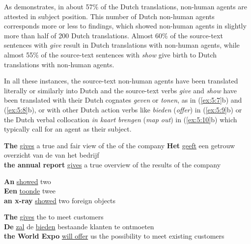\documentclass[output=paper]{LSP/langsci}
\begin{document}
\clearpage
As  demonstrates, in about 57\% of the Dutch translations, non-human agents are attested in subject position. This number of Dutch non-human agents corresponds more or less to \citet{Dhaeyere2010} findings, which showed non-human agents in slightly more than half of 200 Dutch translations. Almost 60\% of the source-text sentences with \textit{give} result in Dutch translations with non-human agents, while almost 55\% of the source-text sentences with \textit{show} give birth to Dutch translations with non-human agents.

In all these instances, the source-text non-human agents have been translated literally or similarly into Dutch and the source-text verbs \textit{give} and \textit{show} have been translated with their Dutch cognates \textit{geven} or \textit{tonen}, as in (\ref{ex:5:7}b) and (\ref{ex:5:8}b), or with other Dutch action verbs like \textit{bieden} (\textit{offer}) in (\ref{ex:5:9}b) or the Dutch verbal collocation \textit{in kaart brengen} (\textit{map out}) in (\ref{ex:5:10}b) which typically call for an agent as their subject.      

\ea \label{ex:5:7}
\ea
\textbf{The}  \ul{gives} a true and fair view of the  of the company
\ex
\textbf{Het}  \ul{geeft} een getrouw overzicht van de  van het bedrijf\\
\textbf{the annual report} \ul{gives} a true overview of the results of the company
\z
\z



\ea \label{ex:5:8}
\ea
\textbf{An}  \ul{showed} two \\[1em]
\ex \textbf{Een}  \ul{toonde} twee \\
\textbf{an x-ray} \ul{showed} two foreign objects
\z
\z




\ea \label{ex:5:9} 
\ea
\textbf{The}  \ul{gives}  the  to meet customers\\[1em]
\ex
\textbf{De}  \ul{zal}  de  \ul{bieden} bestaande klanten te ontmoeten\\
\textbf{the World Expo} \ul{will offer} us the possibility to meet existing customers
\z
\z
\end{document}
